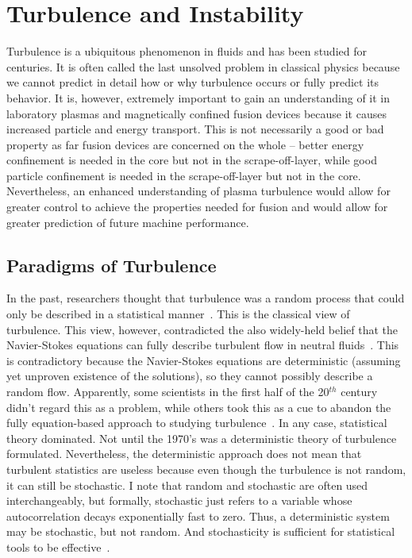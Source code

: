 \chapter{Turbulence and Instability}
\label{c_turb_and_inst}

Turbulence is a ubiquitous phenomenon in fluids and has been studied for centuries. It is often called the last unsolved problem in classical physics because we cannot predict in detail how or why
turbulence occurs or fully predict its behavior. It is, however, extremely important to gain an understanding of it in laboratory plasmas and magnetically confined
fusion devices because it causes increased particle and energy
transport. This is not necessarily a good or bad property as far fusion devices are concerned on the whole -- better energy confinement is needed in the core but not in the scrape-off-layer,
while good particle confinement is needed in the scrape-off-layer but not in the core. Nevertheless, an enhanced understanding of plasma turbulence would allow for greater control to achieve
the properties needed for fusion and would allow for greater prediction of future machine performance.

\section{Paradigms of Turbulence}
\label{s_turb_paradigms}

In the past, researchers thought that turbulence was a random process that could only be described in a statistical manner~\cite{tennekes1972}. This is the classical view of turbulence.
This view, however, contradicted the also widely-held belief that the Navier-Stokes equations can fully describe turbulent flow in neutral fluids~\cite{mcdonough04}. 
This is contradictory because the Navier-Stokes equations are deterministic (assuming yet unproven existence of the solutions), so they cannot possibly describe a random flow.
Apparently, some scientists in the first half of the 20$^{th}$ century didn't regard this as a problem, while others took this as a cue to abandon the fully equation-based approach 
to studying turbulence~\cite{tennekes1972}. In any case, statistical theory dominated. 
Not until the 1970's was a deterministic theory of turbulence formulated. Nevertheless, the deterministic approach does
not mean that turbulent statistics are useless because even though the turbulence is not random, it can still be stochastic. I note that random and stochastic are often used interchangeably,
but formally, stochastic just refers to a variable whose autocorrelation decays exponentially fast to zero. Thus, a deterministic system may be stochastic, but not random. And stochasticity
is sufficient for statistical tools to be effective~\cite{mcdonough04}.

